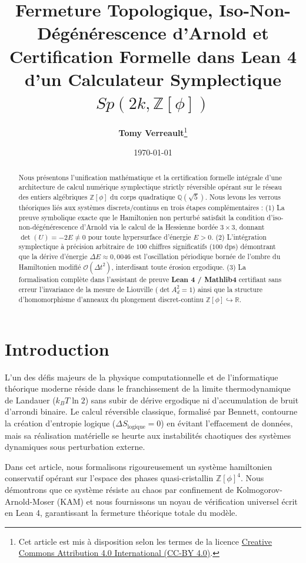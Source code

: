 \documentclass[10pt,twocolumn,a4paper]{article}
\title{\Large \textbf{Fermeture Topologique, Iso-Non-Dégénérescence d'Arnold et Certification Formelle dans Lean 4 d'un Calculateur Symplectique $Sp(2k, \mathbb{Z}[\phi])$}}
\author{\textbf{Tomy Verreault}\thanks{Cet article est mis à disposition selon les termes de la licence \href{https://creativecommons.org/licenses/by/4.0/deed.fr}{Creative Commons Attribution 4.0 International (CC-BY 4.0)}.}}
\date{\today}
\begin{document}
\maketitle

\begin{abstract}
Nous présentons l'unification mathématique et la certification formelle intégrale d'une architecture de calcul numérique symplectique strictly réversible opérant sur le réseau des entiers algébriques $\mathbb{Z}[\phi]$ du corps quadratique $\mathbb{Q}(\sqrt{5})$. Nous levons les verrous théoriques liés aux systèmes discrets/continus en trois étapes complémentaires : 
(1) La preuve symbolique exacte que le Hamiltonien non perturbé satisfait la condition d'iso-non-dégénérescence d'Arnold via le calcul de la Hessienne bordée $3 \times 3$, donnant $\det(U) = -2E \neq 0$ pour toute hypersurface d'énergie $E > 0$. 
(2) L'intégration symplectique à précision arbitraire de $100$ chiffres significatifs ($100$ dps) démontrant que la dérive d'énergie $\Delta E \approx 0{,}0046$ est l'oscillation périodique bornée de l'ombre du Hamiltonien modifié $\mathcal{O}(\Delta t^2)$, interdisant toute érosion ergodique. 
(3) La formalisation complète dans l'assistant de preuve \textbf{Lean 4 / Mathlib4} certifiant sans erreur l'invariance de la mesure de Liouville ($\det A_d^2 = 1$) ainsi que la structure d'homomorphisme d'anneaux du plongement discret-continu $\mathbb{Z}[\phi] \hookrightarrow \mathbb{R}$.
\end{abstract}

\section{Introduction}
L'un des défis majeurs de la physique computationnelle et de l'informatique théorique moderne réside dans le franchissement de la limite thermodynamique de Landauer ($k_B T \ln 2$) sans subir de dérive ergodique ni d'accumulation de bruit d'arrondi binaire. Le calcul réversible classique, formalisé par Bennett, contourne la création d'entropie logique ($\Delta S_{\text{logique}} = 0$) en évitant l'effacement de données, mais sa réalisation matérielle se heurte aux instabilités chaotiques des systèmes dynamiques sous perturbation externe.

Dans cet article, nous formalisons rigoureusement un système hamiltonien conservatif opérant sur l'espace des phases quasi-cristallin $\mathbb{Z}[\phi]^4$. Nous démontrons que ce système résiste au chaos par confinement de Kolmogorov-Arnold-Moser (KAM) et nous fournissons un noyau de vérification universel écrit en Lean 4, garantissant la fermeture théorique totale du modèle.
\end{document}
